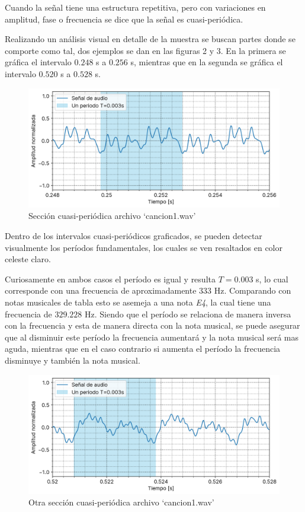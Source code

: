 \documentclass[12pt]{article}
\begin{document}
Cuando la señal tiene una estructura repetitiva, pero con variaciones en
amplitud, fase o frecuencia se dice que la señal es cuasi-periódica.

Realizando un análisis visual en detalle de la muestra se buscan partes
donde se comporte como tal, dos ejemplos se dan en las figuras 2 y 3. En
la primera se gráfica el intervalo \(0.248\) s a \(0.256\) s, mientras
que en la segunda se gráfica el intervalo \(0.520\) s a \(0.528\) s.

\begin{figure}
\centering
\includegraphics{plot/cancion1_0_248s_a_0_256s.png}
\caption{Sección cuasi-periódica archivo `cancion1.wav'}
\label{cancion1_seccion_cuasi_periodica}
\end{figure}

Dentro de los intervalos cuasi-periódicos graficados, se pueden detectar
visualmente los períodos fundamentales, los cuales se ven resaltados en
color celeste claro.

Curiosamente en ambos casos el período es igual y resulta \(T=0.003\) s,
lo cual corresponde con una frecuencia de aproximadamente \(333\) Hz.
Comparando con notas musicales de tabla esto se asemeja a una nota
\emph{E4}, la cual tiene una frecuencia de \(329.228\) Hz. Siendo que el
período se relaciona de manera inversa con la frecuencia y esta de
manera directa con la nota musical, se puede asegurar que al disminuir
este período la frecuencia aumentará y la nota musical será mas aguda,
mientras que en el caso contrario si aumenta el período la frecuencia
disminuye y también la nota musical.

\begin{figure}
\centering
\includegraphics{plot/cancion1_0_520s_a_0_528s.png}
\caption{Otra sección cuasi-periódica archivo `cancion1.wav'}
\label{cancion1_seccion_cuasi_periodica2}
\end{figure}
\end{document}
